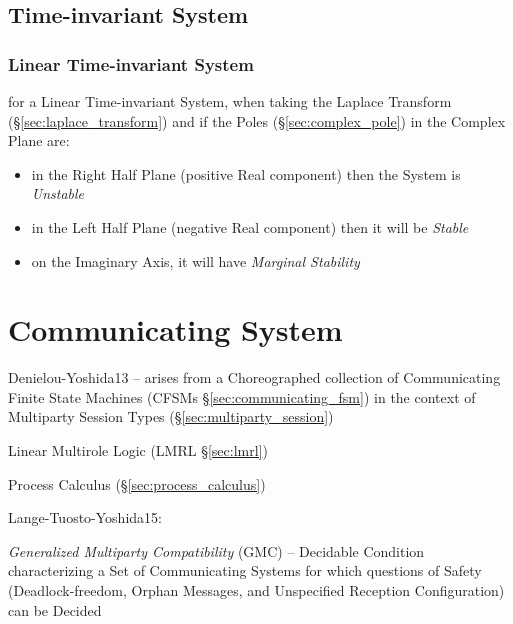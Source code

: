 \subsection{Time-invariant System}\label{sec:time_invariant_system}

\subsubsection{Linear Time-invariant System}\label{sec:lti}

for a Linear Time-invariant System, when taking the Laplace Transform
(\S\ref{sec:laplace_transform}) and if the Poles (\S\ref{sec:complex_pole}) in
the Complex Plane are:
\begin{itemize}
  \item in the Right Half Plane (positive Real component) then the System is
    \emph{Unstable}
  \item in the Left Half Plane (negative Real component) then it will be
    \emph{Stable}
  \item on the Imaginary Axis, it will have \emph{Marginal Stability}
\end{itemize}



\section{Communicating System}\label{sec:communicating_system}

Denielou-Yoshida13 -- arises from a Choreographed collection of
Communicating Finite State Machines (CFSMs
\S\ref{sec:communicating_fsm}) in the context of Multiparty Session
Types (\S\ref{sec:multiparty_session})

Linear Multirole Logic (LMRL \S\ref{sec:lmrl})

\fist Process Calculus (\S\ref{sec:process_calculus})

Lange-Tuosto-Yoshida15:

\emph{Generalized Multiparty Compatibility} (GMC) -- Decidable
Condition characterizing a Set of Communicating Systems for which
questions of Safety (Deadlock-freedom, Orphan Messages, and
Unspecified Reception Configuration) can be Decided

